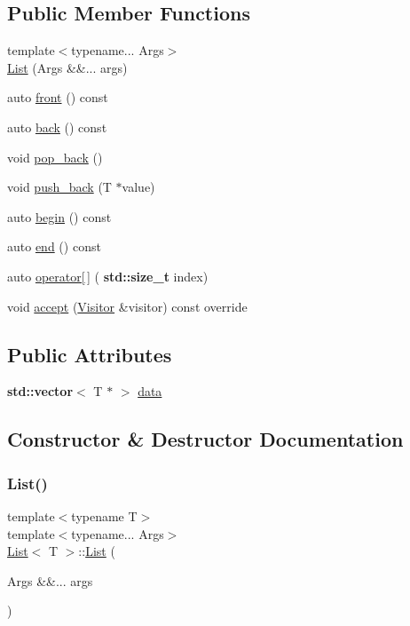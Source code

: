 \subsection*{Public Member Functions}
\begin{DoxyCompactItemize}
\item 
{\footnotesize template$<$typename... Args$>$ }\\\hyperlink{struct_list_a622a2ade2682950b9346ac692b17039c}{List} (Args \&\&... args)
\item 
auto \hyperlink{struct_list_a4efaea597a8cea09cc9e7717e6a9f80a}{front} () const
\item 
auto \hyperlink{struct_list_a6949268f152305afc5bac0ee3e5bb838}{back} () const
\item 
void \hyperlink{struct_list_a42e1aee3e26b76b3f4d9386efa7fe8b7}{pop\+\_\+back} ()
\item 
void \hyperlink{struct_list_af4ca3dd63fcff83845b673dfd7d5d715}{push\+\_\+back} (T $\ast$value)
\item 
auto \hyperlink{struct_list_afa6f9828eab89e2fcae63b612927fabb}{begin} () const
\item 
auto \hyperlink{struct_list_a22f91e0dfc7ab053952fc8ed33e5cd53}{end} () const
\item 
auto \hyperlink{struct_list_a40b4d77cbee9b7c311c304cafbf07d1e}{operator\mbox{[}$\,$\mbox{]}} (\textbf{ std\+::size\+\_\+t} index)
\item 
void \hyperlink{struct_list_a9d87bf19af4c0cca46520b694da550f0}{accept} (\hyperlink{struct_visitor}{Visitor} \&visitor) const override
\end{DoxyCompactItemize}
\subsection*{Public Attributes}
\begin{DoxyCompactItemize}
\item 
\textbf{ std\+::vector}$<$ T $\ast$ $>$ \hyperlink{struct_list_afcdf492754937d2dbd6c1f89f8abf888}{data}
\end{DoxyCompactItemize}


\subsection{Constructor \& Destructor Documentation}
\mbox{\label{struct_list_a622a2ade2682950b9346ac692b17039c}} 
\subsubsection{\texorpdfstring{List()}{List()}}
{\footnotesize\ttfamily template$<$typename T$>$ \\
template$<$typename... Args$>$ \\
\hyperlink{struct_list}{List}$<$ T $>$\+::\hyperlink{struct_list}{List} (\begin{DoxyParamCaption}\item[{Args \&\&...}]{args }\end{DoxyParamCaption})\hspace{0.3cm}{\ttfamily [inline]}}



